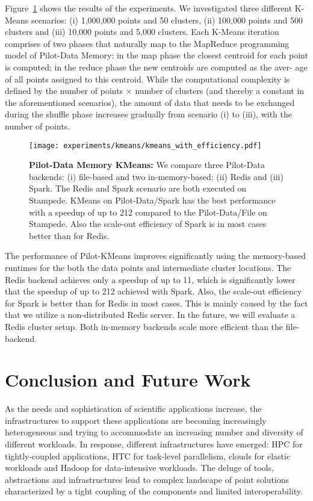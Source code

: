 \documentclass{sig-alternate}
\newcommand{\pilot}{Pilot\xspace}
\newcommand{\pilotdata}{Pilot-Data\xspace}
\newcommand{\pilotdatainmem}{Pilot-Data Memory\xspace}
\begin{document}
Figure~\ref{fig:experiments_kmeans_kmeans} shows the results of the
experiments. We investigated three different K-Means scenarios: (i)
1,000,000 points and 50 clusters, (ii) 100,000 points and 500
clusters and (iii) 10,000 points and 5,000 clusters. Each K-Means
iteration comprises of two phases that naturally map to the MapReduce
programming model of \pilotdatainmem: in the map phase the closest
centroid for each point is computed; in the reduce phase the new
centroids are computed as the aver- age of all points assigned to this
centroid. While the computational complexity is defined by the number
of points $\times$ number of clusters (and thereby a constant in the
aforementioned scenarios), the amount of data that needs to be
exchanged during the shuffle phase increases gradually from scenario
(i) to (iii), with the number of points.

\begin{figure}[t]
    \centering        \texttt{[image: experiments/kmeans/kmeans\_with\_efficiency.pdf]}
    \caption{\textbf{\pilotdatainmem KMeans:} We compare three Pilot-Data 
    backends: (i) file-based and two in-memory-based: (ii) Redis and (iii) 
    Spark. The Redis and Spark 
    scenario are both executed on Stampede. KMeans on \pilotdata/Spark has the 
    best performance with a speedup of up to 212 compared to the 
    \pilotdata/File on Stampede. Also the scale-out efficiency of Spark is in most cases better than for Redis.}
    \label{fig:experiments_kmeans_kmeans}
\end{figure}

The performance of \pilot-KMeans improves significantly using the memory-based
runtimes for the both the data points and intermediate cluster locations. The
Redis backend achieves only a speedup of up to 11, which is significantly lower
that the speedup of up to 212 achieved with Spark. Also, the scale-out
efficiency for Spark is better than for Redis in most cases. This is mainly
caused by the fact that we utilize a non-distributed Redis server. In the
future, we will evaluate a Redis cluster setup. Both in-memory backends
scale more efficient than the file-backend.






\section{Conclusion and Future Work}
\label{sec:conclusion}

As the needs and sophistication of scientific applications increase,
the infrastructures to support these applications are becoming
increasingly heterogeneous and trying to accommodate an increasing
number and diversity of different workloads. In response, different
infrastructures have emerged: HPC for tightly-coupled applications,
HTC for task-level parallelism, clouds for elastic workloads and
Hadoop for data-intensive workloads. The deluge of tools, abstractions and 
infrastructures lead to complex landscape of point solutions characterized by a
tight coupling of the components and limited interoperability.
\end{document}
